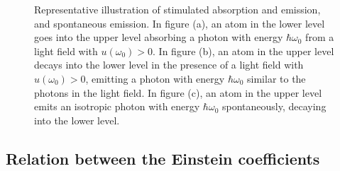 \begin{figure}[H]
\begin{subfigure}[t]{0.32\textwidth}
		\vspace{5pt}
		\label{img:spontaneous-emission}
	\end{subfigure}
	\caption{Representative illustration of stimulated absorption and emission, and spontaneous emission. In figure (a), an atom in the lower level goes into the upper level absorbing a photon with energy $ \hbar \omega_0 $ from a light field with $ u(\omega_0) > 0 $. In figure (b), an atom in the upper level decays into the lower level in the presence of a light field with $ u(\omega_0) > 0 $, emitting a photon with energy $\hbar \omega_0 $ similar to the photons in the light field. In figure (c), an atom in the upper level emits an isotropic photon with energy $ \hbar \omega_0 $ spontaneously, decaying into the lower level.}
	\label{fig:optical-transitions}
\end{figure}

%
\subsection{Relation between the Einstein coefficients}
%

